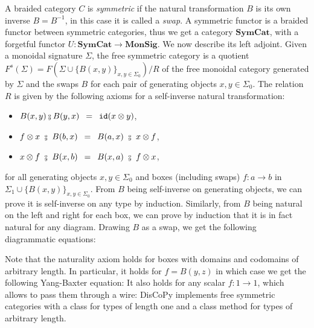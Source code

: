 A braided category $C$ is \emph{symmetric} if the natural transformation $B$ is its own inverse $B = B^{-1}$, in this case it is called a \emph{swap}.
A symmetric functor is a braided functor between symmetric categories, thus we get a category $\mathbf{SymCat}$, with a forgetful functor $U : \mathbf{SymCat} \to \mathbf{MonSig}$.
We now describe its left adjoint.
Given a monoidal signature $\Sigma$, the free symmetric category is a quotient $F^s(\Sigma) = F(\Sigma \cup \{ B(x, y) \}_{x, y \in \Sigma_0}) / R$ of the free monoidal category generated by $\Sigma$ and the swaps $B$ for each pair of generating objects $x, y \in \Sigma_0$.
The relation $R$ is given by the following axioms for a self-inverse natural transformation:
\begin{itemize}
\item $B(x, y) \fcmp B(y, x) \s = \s \id(x \otimes y)$,
\item $f \otimes x \ \fcmp \ B(b, x) \s = \s B(a, x) \ \fcmp \ x \otimes f$,
\item $x \otimes f \ \fcmp \ B(x, b) \s = \s B(x, a) \ \fcmp \ f \otimes x$,
\end{itemize}
for all generating objects $x, y \in \Sigma_0$ and boxes (including swaps) $f : a \to b$ in $\Sigma_1 \cup \{ B(x, y) \}_{x, y \in \Sigma_0}$.
From $B$ being self-inverse on generating objects, we can prove it is self-inverse on any type by induction.
Similarly, from $B$ being natural on the left and right for each box, we can prove by induction that it is in fact natural for any diagram.
Drawing $B$ as a swap, we get the following diagrammatic equations:
\begin{center}
\hspace{50pt}
\end{center}
Note that the naturality axiom holds for boxes with domains and codomains of arbitrary length.
In particular, it holds for $f = B(y, z)$ in which case we get the following Yang-Baxter equation:
It also holds for any scalar $f : 1 \to 1$, which allows to pass them through a wire:
DisCoPy implements free symmetric categories with a class  for types of length one and a class method  for types of arbitrary length.

